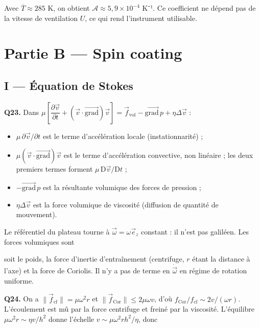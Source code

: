 \documentclass[11pt,a4paper]{article}
\providecommand{\tightlist}{\setlength{\itemsep}{0pt}\setlength{\parskip}{0pt}}
\newcommand{\equationajustee}[1]{%
  \sbox{\boiteequation}{$\displaystyle #1$}%
  \ifdim\wd\boiteequation>\linewidth
    \[\resizebox{\linewidth}{!}{\usebox{\boiteequation}}\]%
  \else
    \[#1\]%
  \fi}
\begin{document}
Avec \(\overline T\approx285\) K, on obtient \(\mathcal A\approx5{,}9\times10^{-4}\) K⁻¹. Ce coefficient ne dépend pas de la vitesse de ventilation \(U\), ce qui rend l'instrument utilisable.

\hypertarget{partie-b-spin-coating}{%
\section{Partie B --- Spin coating}\label{partie-b-spin-coating}}

\hypertarget{i-uxe9quation-de-stokes}{%
\subsection{I --- Équation de Stokes}\label{i-uxe9quation-de-stokes}}

\textbf{Q23.} Dans \(\mu\left[\dfrac{\partial\vec v}{\partial t}+(\vec v\cdot\overrightarrow{\text{grad}})\vec v\right]=\vec f_{\text{vol}}-\overrightarrow{\text{grad}}\,p+\eta\Delta\vec v\) :

\begin{itemize}
\tightlist
\item
  \(\mu\,\partial\vec v/\partial t\) est le terme d'accélération locale (instationnarité) ;
\item
  \(\mu(\vec v\cdot\overrightarrow{\text{grad}})\vec v\) est le terme d'accélération convective, non linéaire ; les deux premiers termes forment \(\mu\,\mathrm D\vec v/\mathrm Dt\) ;
\item
  \(-\overrightarrow{\text{grad}}\,p\) est la résultante volumique des forces de pression ;
\item
  \(\eta\Delta\vec v\) est la force volumique de viscosité (diffusion de quantité de mouvement).
\end{itemize}

Le référentiel du plateau tourne à \(\vec\omega=\omega\vec e_z\) constant : il n'est pas galiléen. Les forces volumiques sont

\equationajustee{\boxed{\vec f_{\text{vol}}=\mu\vec g+\mu\omega^2r\,\vec e_r-2\mu\,\vec\omega\wedge\vec v}}

soit le poids, la force d'inertie d'entraînement (centrifuge, \(r\) étant la distance à l'axe) et la force de Coriolis. Il n'y a pas de terme en \(\dot{\vec\omega}\) en régime de rotation uniforme.

\textbf{Q24.} On a \(\|\vec f_{\text{cf}}\|=\mu\omega^2r\) et \(\|\vec f_{\text{Cor}}\|\le2\mu\omega v\), d'où \(f_{\text{Cor}}/f_{\text{cf}}\sim2v/(\omega r)\). L'écoulement est mû par la force centrifuge et freiné par la viscosité. L'équilibre \(\mu\omega^2r\sim\eta v/h^2\) donne l'échelle \(v\sim\mu\omega^2rh^2/\eta\), donc
\end{document}
